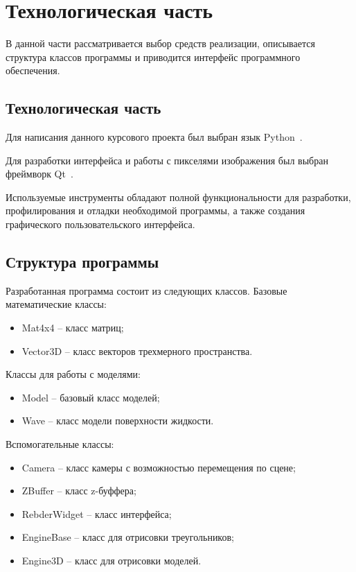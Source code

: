 \chapter{Технологическая часть}

В данной части рассматривается выбор средств реализации, описывается структура классов программы и приводится интерфейс программного обеспечения.

\section{Технологическая часть}

Для написания данного курсового проекта был выбран язык Python~\cite{python}.

Для разработки интерфейса и работы с пикселями изображения был выбран фреймворк Qt~\cite{qt-framefork}.

Используемые инструменты обладают полной функциональности для разработки, профилирования и отладки необходимой программы, а также создания графического пользовательского интерфейса.


\section{Структура программы}
Разработанная программа состоит из следующих классов. 
Базовые математические классы:
\begin{itemize}[label*=---]
    \item Mat4x4 -- класс матриц;
    \item Vector3D -- класс векторов трехмерного пространства.
\end{itemize}

Классы для работы с моделями:
\begin{itemize}[label*=---]
    \item Model -- базовый класс моделей;
    \item Wave -- класс модели поверхности жидкости.
\end{itemize}

Вспомогательные классы:
\begin{itemize}[label*=---]
    \item Camera -- класс камеры с возможностью перемещения по сцене;
    \item ZBuffer -- класс z-буффера;
    \item RebderWidget -- класс интерфейса;
    \item EngineBase -- класс для отрисовки треугольников;
    \item Engine3D -- класс для отрисовки моделей.
\end{itemize}


